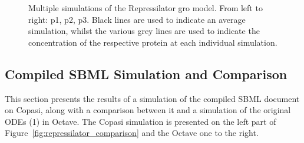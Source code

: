\documentclass[12pt]{article}
\begin{document}
\begin{figure}[ht]
    \endminipage
    \caption{Multiple simulations of the Repressilator gro model. From left to right: p1, p2, p3. Black lines are used to indicate an average simulation, whilst the various grey lines are used to indicate the concentration of the respective protein at each individual simulation.}
    \label{fig:tons_of_simulations}
    \end{figure}

\subsection{Compiled SBML Simulation and Comparison}

    This section presents the results of a simulation of the compiled SBML document on Copasi, along with a comparison between it and a simulation of the original ODEs (1) in Octave. The Copasi simulation is presented on the left part of Figure~\ref{fig:repressilator_comparison} and the Octave one to the right.
    
\end{document}
